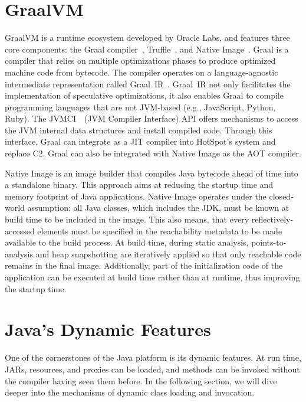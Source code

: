 \section{GraalVM}
GraalVM is a runtime ecosystem developed by Oracle Labs, and features three core components: the Graal compiler~\cite{noauthor_graal_nodate}, Truffle~\cite{noauthor_truffle_nodate}, and Native Image~\cite{wimmer_initialize_2019}.
Graal is a compiler that relies on multiple optimizations phases to produce optimized machine code from bytecode. The compiler operates on a language-agnostic intermediate representation called Graal~IR~\cite{duboscq_graal_2013}. Graal~IR not only facilitates the implementation of speculative optimizations, it also enables Graal to compile  programming languages that are not JVM-based (e.g., JavaScript, Python, Ruby). %
The JVMCI~\cite{noauthor_jep_nodate}~(JVM Compiler Interface) API offers mechanisms to access the JVM internal data structures and install compiled code. Through this interface, Graal can integrate as a JIT compiler into HotSpot's system and replace C2. 
Graal can also be integrated with Native Image as the AOT compiler.

Native Image is an image builder that compiles Java bytecode ahead of time into a standalone binary. This approach aims at reducing the startup time and memory footprint of Java applications. Native Image operates under the closed-world assumption: all Java classes, which includes the JDK, must be known at build time to be included in the image.
This also means, that every reflectively-accessed elements must be specified in the reachability metadata to be made available to the build process. 
At build time, during static analysis, points-to-analysis and heap snapshotting are iteratively applied so that only reachable code remains in the final image. Additionally, part of the initialization code of the application can be executed at build time rather than at runtime, thus improving the startup time.

\section{Java's Dynamic Features}
One of the cornerstones of the Java platform is its dynamic features. At run time, JARs, resources, and proxies can be loaded, and methods can be invoked without the compiler having seen them before. In the following section, we will dive deeper into the mechanisms of dynamic class loading and invocation.


